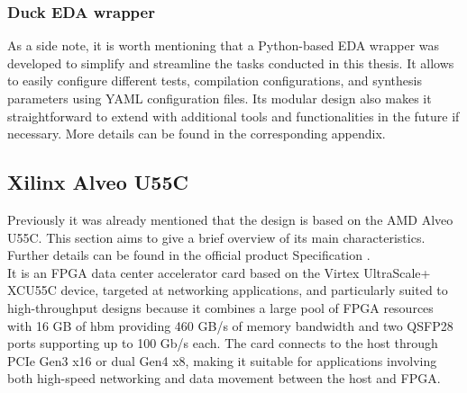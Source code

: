 \subsubsection{Duck EDA wrapper}
As a side note, it is worth mentioning that a Python-based EDA wrapper was developed to simplify and 
streamline the tasks conducted in this thesis. It allows to easily configure different tests, 
compilation configurations, and synthesis parameters using YAML configuration files. Its modular design 
also makes it straightforward to extend with additional tools and functionalities in the future if necessary. 
More details can be found in the corresponding appendix.

\subsection{Xilinx Alveo U55C}\label{u55c}

Previously it was already  mentioned that the design is based on the AMD Alveo U55C. This section aims to give 
a brief overview of its main characteristics. Further details can be found in the official product Specification \cite{amd_alveo_u55c}. \\

It is an FPGA data center accelerator card based on the Virtex UltraScale+ XCU55C device, targeted at networking applications, 
and particularly suited to high-throughput designs because it combines a large pool of FPGA resources with 16 GB of \gls{hbm} providing 460 GB/s of memory 
bandwidth and two QSFP28 ports supporting up to 100 Gb/s each. The card connects to the host through PCIe Gen3 x16 
or dual Gen4 x8, making it suitable for applications involving both high-speed networking and data movement 
between the host and FPGA. \\


